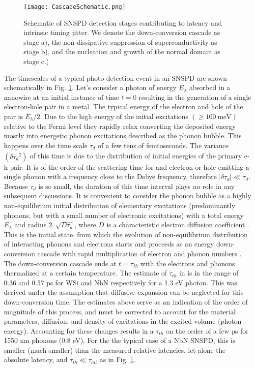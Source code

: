 \documentclass[%
reprint,
 amsmath,amssymb,
aps,
pra,
]{revtex4-1}
\begin{document}
\begin{figure}
\texttt{[image: CascadeSchematic.png]} 
\caption{Schematic of SNSPD detection stages contributing to latency and intrinsic timing jitter.  We denote the down-conversion cascade as stage a), the non-dissipative suppression of superconductivity as stage b), and the nucleation and growth of the normal domain as stage c.)}
\label{F Latency Schematic}
\end{figure}

\quad The timescales of a typical photo-detection event in an SNSPD are shown schematically in Fig. \ref{F Latency Schematic}. Let's consider a photon of energy \(E_\lambda\) absorbed in a nanowire at an initial instance of time \(t = 0\)  resulting in the generation of a single electron-hole pair in a metal. The typical energy of the electron and hole of the pair is \(E_\lambda/2\). Due to the high energy of the initial excitations \((\geq 100~\text{meV})\) relative to the Fermi level they rapidly relax converting the deposited energy mostly into energetic phonon excitations \cite{kozorezov_quasiparticle-phonon_2000,kozorezov_fano_2017} described as the phonon bubble. This happens over the time scale \(\tau_d\) of a few tens of femtoseconds.  The variance \(\overline{(\delta{\tau_d}^2)}\) of this time is due to the distribution of initial energies of the primary e-h pair. It is of the order of the scattering time for and electron or hole emitting a single phonon with a frequency close to the Debye frequency, therefore \(|\delta\tau_d |\ll \tau_d\). Because \(\tau_d\) is so small, the duration of this time interval plays no role in any subsequent discussions.  It is convenient to consider the phonon bubble as a highly non-equilibrium initial distribution of elementary excitations (predominantly phonons, but with a small number of electronic excitations) with a total energy \(E_\lambda\) and radius \(2~\sqrt[]{D\tau_d}\), where \(D\) is a characteristic electron diffusion coefficient \cite{kozorezov_fano_2017, kozorezov_quasiparticle-phonon_2000}. This is the initial state, from which the evolution of non-equilibrium distribution of interacting phonons and electrons starts and proceeds as an energy down-conversion cascade with rapid multiplication of electron and phonon numbers \cite{vodolazov_single-photon_2017,kozorezov_fano_2017}. The down-conversion cascade ends at \(t = \tau_{th}\) with the electrons and phonons thermalized at a certain temperature.  The estimate of \(\tau_{th}\) in \cite{vodolazov_single-photon_2017} is in the range of 0.36 and 0.57 ps for WSi and NbN respectively for a 1.3 eV photon. This was derived under the assumption that diffusive expansion can be neglected for this down-conversion time. The estimates above serve as an indication of the order of magnitude of this process, and must be corrected to account for the material parameters, diffusion, and density of excitations in the excited volume (photon energy). Accounting for these changes results in a \(\tau_{th}\) on the order of a few ps for 1550 nm phonons (0.8 eV).  For the the typical case of a NbN SNSPD, this is smaller (much smaller) than the measured relative latencies, let alone the absolute latency, and \(\tau_{th} \ll \tau_{lat}\) as in Fig. \ref{F Latency Schematic}.  
\end{document}
